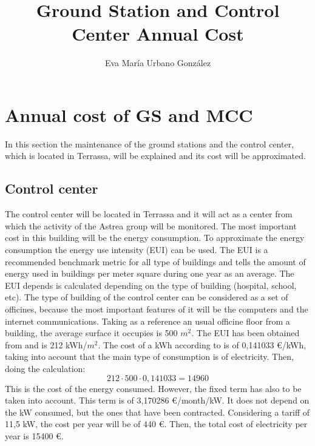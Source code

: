 \documentclass[12pt,a4paper]{report}
\author{Eva María Urbano González}
\title{Ground Station and Control Center Annual Cost}
\begin{document}
\maketitle
\listoffigures
\listoftables
\section{Annual cost of GS and MCC}
In this section the maintenance of the ground stations and the control center, which is located in Terrassa, will be explained and its cost will be approximated.
\subsection{Control center}
The control center will be located in Terrassa and it will act as a center from which the activity of the Astrea group will be monitored. The most important cost in this building will be the energy consumption. To approximate the energy consumption the energy use intensity (EUI) can be used. The EUI is a recommended benchmark metric for all type of buildings and tells the amount of energy used in buildings per meter square during one year as an average. The EUI depends is calculated depending on the type of building (hospital, school, etc). The type of building of the control center can be considered as a set of officines, because the most important features of it will be the computers and the internet communications. Taking as a reference an usual officine floor from a building, the average surface it occupies is 500 $m^2$. The EUI has been obtained from \cite{EUI} and is 212 kWh/$m^2$. The cost of a kWh according to \cite{endesa} is of 0,141033 \euro /kWh, taking into account that the main type of consumption is of electricity. Then, doing the calculation: 
\begin{equation}
212 \cdot 500 \cdot 0,141033 = 14960
\end{equation} 
This is the cost of the energy consumed. However, the fixed term has also to be taken into account. This term is of 3,170286 \euro /month/kW. It does not depend on the kW consumed, but the ones that have been contracted. Considering a tariff of 11,5 kW, the cost per year will be of 440 \euro. Then, the total cost of electricity per year is 15400 \euro.\\
\end{document}
